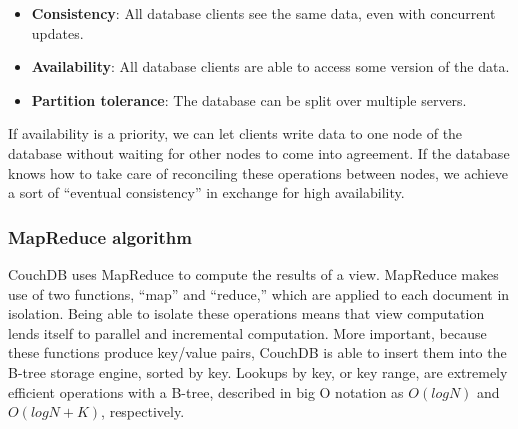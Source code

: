 \begin{itemize}
    \item \textbf{Consistency}: All database clients see the same data, even with concurrent updates.
    \item \textbf{Availability}: All database clients are able to access some version of the data.
    \item \textbf{Partition tolerance}: The database can be split over multiple servers.
\end{itemize}

If availability is a priority, we can let clients write data to one node of the 
database without waiting for other nodes to come into agreement. If the database 
knows how to take care of reconciling these operations between nodes, we achieve 
a sort of “eventual consistency” in exchange for high availability.

\subsubsection{MapReduce algorithm}

CouchDB uses MapReduce to compute the results of a view. MapReduce makes use of two 
functions, “map” and “reduce,” which are applied to each document in isolation. 
Being able to isolate these operations means that view computation lends itself 
to parallel and incremental computation. More important, because these functions 
produce key/value pairs, CouchDB is able to insert them into the B-tree storage engine, 
sorted by key. Lookups by key, or key range, are extremely efficient operations with a 
B-tree, described in big O notation as $O(log N)$ and $O(log N + K)$, respectively.~\cite{CouchDB}
